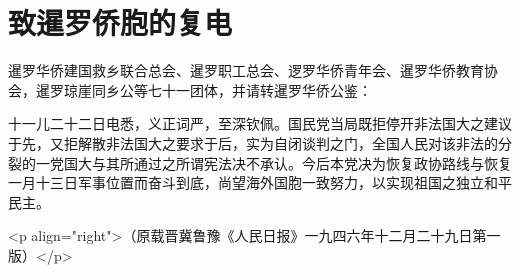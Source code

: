 \section[致暹罗侨胞的复电（一九四六年十二月二十五日）]{致暹罗侨胞的复电}


暹罗华侨建国救乡联合总会、暹罗职工总会、逻罗华侨青年会、暹罗华侨教育协会，暹罗琼崖同乡公等七十一团体，并请转暹罗华侨公鉴：

十一儿二十二日电悉，义正词严，至深钦佩。国民党当局既拒停开非法国大之建议于先，又拒解散非法国大之要求于后，实为自闭谈判之门，全国人民对该非法的分裂的一党国大与其所通过之所谓宪法决不承认。今后本党决为恢复政协路线与恢复一月十三日军事位置而奋斗到底，尚望海外国胞一致努力，以实现祖国之独立和平民主。

<p align="right">（原载晋冀鲁豫《人民日报》一九四六年十二月二十九日第一版）</p>




